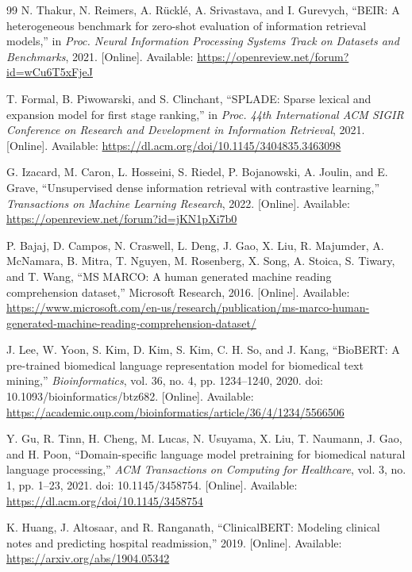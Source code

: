 \begin{thebibliography}{99}
N. Thakur, N. Reimers, A. R{\"u}ckl{\'e}, A. Srivastava, and I. Gurevych,
``BEIR: A heterogeneous benchmark for zero-shot evaluation of information retrieval models,''
in \textit{Proc. Neural Information Processing Systems Track on Datasets and Benchmarks}, 2021.
[Online]. Available: \url{https://openreview.net/forum?id=wCu6T5xFjeJ}

T. Formal, B. Piwowarski, and S. Clinchant,
``SPLADE: Sparse lexical and expansion model for first stage ranking,''
in \textit{Proc. 44th International ACM SIGIR Conference on Research and Development in Information Retrieval}, 2021.
[Online]. Available: \url{https://dl.acm.org/doi/10.1145/3404835.3463098}

G. Izacard, M. Caron, L. Hosseini, S. Riedel, P. Bojanowski, A. Joulin, and E. Grave,
``Unsupervised dense information retrieval with contrastive learning,''
\textit{Transactions on Machine Learning Research}, 2022.
[Online]. Available: \url{https://openreview.net/forum?id=jKN1pXi7b0}

P. Bajaj, D. Campos, N. Craswell, L. Deng, J. Gao, X. Liu, R. Majumder, A. McNamara, B. Mitra, T. Nguyen, M. Rosenberg, X. Song, A. Stoica, S. Tiwary, and T. Wang,
``MS MARCO: A human generated machine reading comprehension dataset,''
Microsoft Research, 2016.
[Online]. Available: \url{https://www.microsoft.com/en-us/research/publication/ms-marco-human-generated-machine-reading-comprehension-dataset/}

J. Lee, W. Yoon, S. Kim, D. Kim, S. Kim, C. H. So, and J. Kang,
``BioBERT: A pre-trained biomedical language representation model for biomedical text mining,''
\textit{Bioinformatics}, vol. 36, no. 4, pp. 1234--1240, 2020.
doi: 10.1093/bioinformatics/btz682.
[Online]. Available: \url{https://academic.oup.com/bioinformatics/article/36/4/1234/5566506}

Y. Gu, R. Tinn, H. Cheng, M. Lucas, N. Usuyama, X. Liu, T. Naumann, J. Gao, and H. Poon,
``Domain-specific language model pretraining for biomedical natural language processing,''
\textit{ACM Transactions on Computing for Healthcare}, vol. 3, no. 1, pp. 1--23, 2021.
doi: 10.1145/3458754.
[Online]. Available: \url{https://dl.acm.org/doi/10.1145/3458754}

K. Huang, J. Altosaar, and R. Ranganath,
``ClinicalBERT: Modeling clinical notes and predicting hospital readmission,''
2019.
[Online]. Available: \url{https://arxiv.org/abs/1904.05342}


\end{thebibliography}

